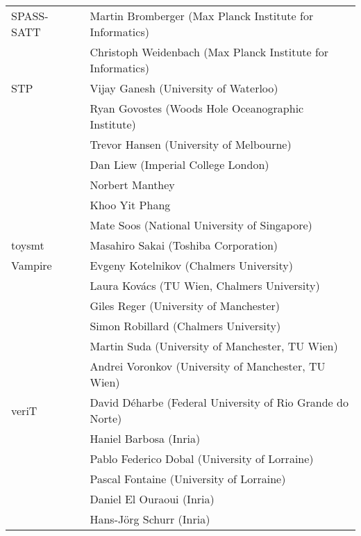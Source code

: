 {\begin{table}
\begin{tabular}{ll}
      SPASS-SATT~\cite{Bromberger:2019} %
      & Martin Bromberger (Max Planck Institute for Informatics) \\
      & Christoph Weidenbach (Max Planck Institute for Informatics)
      \\ \midrule

      STP~\cite{ganesh07}
      & Vijay Ganesh (University of Waterloo) \\
      & Ryan Govostes (Woods Hole Oceanographic Institute) \\
      & Trevor Hansen (University of Melbourne) \\
      & Dan Liew (Imperial College London) \\
      & Norbert Manthey \\
      & Khoo Yit Phang \\
      & Mate Soos (National University of Singapore)
      \\ \midrule

      toysmt
      & Masahiro Sakai (Toshiba Corporation)
      \\ \midrule

      Vampire~\cite{DBLP:conf/cav/KovacsV13}
      & Evgeny Kotelnikov (Chalmers University) \\
      & Laura Kov\'acs (TU Wien, Chalmers University) \\
      & Giles Reger (University of Manchester) \\
      & Simon Robillard (Chalmers University) \\
      & Martin Suda (University of Manchester, TU Wien) \\
      & Andrei Voronkov (University of Manchester, TU Wien)
      \\ \midrule

      veriT~\cite{DBLP:conf/cade/BoutonODF09}
      & David D\'eharbe (Federal University of Rio Grande do Norte) \\
      & Haniel Barbosa (Inria) \\
      & Pablo Federico Dobal (University of Lorraine) \\
      & Pascal Fontaine (University of Lorraine) \\
      & Daniel El Ouraoui (Inria) \\
      & Hans-J\"org Schurr (Inria)
      \\ \midrule



\end{tabular}
\end{table}}
